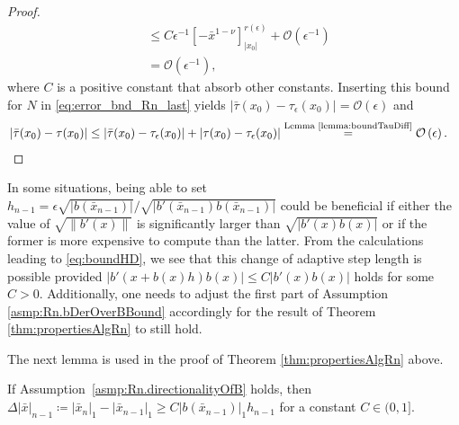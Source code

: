 \documentclass[a4paper, oneside, reqno]{amsart}
\newcommand{\abs}[1]{\left\lvert#1\right\rvert}
\newcommand{\norm}[1]{\left\|#1\right\|}
\theoremstyle{remark}
\begin{document}
\begin{proof}
\begin{align*}
          &\leq C\epsilon^{-1}\left[-\bar x^{1-\nu}\right]_{\abs{x_0}}^{r(\epsilon)} + \mathcal{O}\left(\epsilon^{-1}\right)\\
          & =\mathcal{O}\left(\epsilon^{-1}\right),
\end{align*}
where \(C\) is a positive constant that absorb other constants.
Inserting this bound for \(N\) in \eqref{eq:error_bnd_Rn_last} yields 
$\abs{\bar\tau(x_0)-\tau_{\epsilon}(x_0)} = \mathcal{O}\left(\epsilon\right)$
and 
\begin{align*}
    &\abs{\bar\tau(x_0)-\tau(x_0)} \leq \abs{\bar\tau(x_0)-\tau_\epsilon(x_0)} + \abs{\tau(x_0)-\tau_\epsilon(x_0)} 
    \stackrel{\text{Lemma \ref{lemma:boundTauDiff}}}{=} \mathcal{O}\left(\epsilon\right).
\end{align*}
\end{proof}
\begin{remark}
\label{rem:altHRn}
    In some situations, being able to set \(h_{n-1} = \epsilon\sqrt{\abs{b(\bar x_{n-1})}}/\sqrt{\abs{b'(\bar x_{n-1})b(\bar x_{n-1})}}\) could be beneficial if either the value of \(\sqrt{\norm{b'(x)}}\) is significantly larger than \(\sqrt{\abs{b'(x)b(x)}}\) or if the former is more expensive to compute than the latter. From the calculations leading to \eqref{eq:boundHD}, we see that this change of adaptive step length is possible provided \(\abs{b'(x+b(x)h)b(x)} \leq C\abs{b'(x)b(x)}\) holds for some \(C>0\). Additionally, one needs to adjust the first part of Assumption \ref{asmp:Rn.bDerOverBBound} accordingly for the result of Theorem \ref{thm:propertiesAlgRn} to still hold. 
\end{remark}

The next lemma is used in the proof of Theorem \ref{thm:propertiesAlgRn} above.

\begin{lemma}[Lower bound on \(\Delta \abs{\bar x}_{n-1}\)]
\label{lemma:LwrBndDeltaNormX}
If Assumption~\ref{asmp:Rn.directionalityOfB} holds, then~\\\mbox{\(\Delta \abs{\bar x}_{n-1} \coloneqq \abs{\bar x_{n}}_1 - \abs{\bar x_{n-1}}_1\geq C\abs{b(\bar x_{n-1})}_1h_{n-1}\)} for a constant \(C \in (0, 1]\).
\end{lemma}
\end{document}
